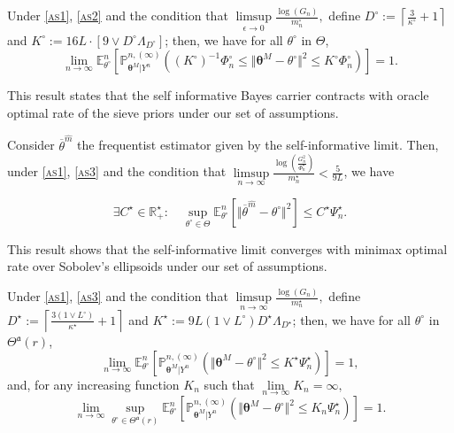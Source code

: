 \begin{thm}\label{thm4}
Under \textsc{\cref{as1}}, \textsc{\cref{as2}} and the condition that $\limsup\limits_{\epsilon \rightarrow 0} \frac{\log\left(G_{n}\right)}{m_{n}^{\circ}},$ define $D^{\circ} := \left\lceil \frac{3}{\kappa^{\circ}} + 1 \right\rceil$ and $K^{\circ} := 16 L \cdot \left[9 \vee D^{\circ} \Lambda_{D^{\circ}}\right]$; then, we have for all $\theta^{\circ}$ in $\Theta$,
\[\lim\limits_{n \rightarrow \infty} \mathds{E}_{\theta^{\circ}}^{n}\left[\mathds{P}_{\boldsymbol{\theta}^{M} \vert Y^{n}}^{n, (\infty)}\left(\left(K^{\circ}\right)^{-1} \Phi_{n}^{\circ} \leq \Vert \boldsymbol{\theta}^{M} - \theta^{\circ} \Vert^{2} \leq K^{\circ} \Phi_{n}^{\circ} \right)\right] = 1.\]
\end{thm}

This result states that the self informative Bayes carrier contracts with oracle optimal rate of the sieve priors under our set of assumptions.


\begin{thm}\label{thm5}
Consider $\overline{\theta}^{\widehat{m}}$ the frequentist estimator given by the self-informative limit.
Then, under \textsc{\cref{as1}}, \textsc{\cref{as3}} and the condition that $\limsup\limits_{n \rightarrow \infty}\frac{\log\left(\frac{G_{n}^{2}}{\Phi_{n}^{\star}}\right)}{m_{n}^{\star}} < \frac{5}{9 L}$, we have

\[\exists C^{\star} \in \mathds{R}_{+}^{\star} : \quad \sup\limits_{\theta^{\circ}\in \Theta}\mathds{E}_{\theta^{\circ}}^{n}\left[\Vert \overline{\theta}^{\widehat{m}} - \theta^{\circ} \Vert^{2}\right] \leq C^{\star} \Psi_{n}^{\star}.\]
\end{thm}

This result shows that the self-informative limit converges with minimax optimal rate over Sobolev's ellipsoids under our set of assumptions.

\begin{thm}\label{thm6}
Under \textsc{\cref{as1}}, \textsc{\cref{as3}} and the condition that $\limsup\limits_{n \rightarrow \infty} \frac{\log\left(G_{n}\right)}{m_{n}^{\star}},$ define $D^{\star} := \left\lceil \frac{3 \left(1 \vee L^{\circ}\right)}{\kappa^{\star}} + 1 \right\rceil$ and $K^{\star} := 9 L \left(1 \vee L^{\circ} \right) D^{\star} \Lambda_{D^{\star}}$; then, we have for all $\theta^{\circ}$ in $\Theta^{\mathfrak{a}}(r)$,
\[\lim\limits_{n \rightarrow \infty} \mathds{E}_{\theta^{\circ}}^{n}\left[\mathds{P}_{\boldsymbol{\theta}^{M} \vert Y^{n}}^{n, (\infty)}\left(\Vert \boldsymbol{\theta}^{M} - \theta^{\circ} \Vert^{2} \leq K^{\star} \Psi_{n}^{\star} \right)\right] = 1,\]
and, for any increasing function $K_{n}$ such that $\lim\limits_{n \rightarrow \infty} K_{n} = \infty,$
\[\lim\limits_{n \rightarrow \infty} \sup\limits_{\theta^{\circ} \in \Theta^{\mathfrak{a}}(r)} \mathds{E}_{\theta^{\circ}}^{n}\left[\mathds{P}_{\boldsymbol{\theta}^{M} \vert Y^{n}}^{n, (\infty)}\left(\Vert \boldsymbol{\theta}^{M} - \theta^{\circ} \Vert^{2} \leq K_{n} \Psi_{n}^{\star} \right)\right] = 1.\]
\end{thm}